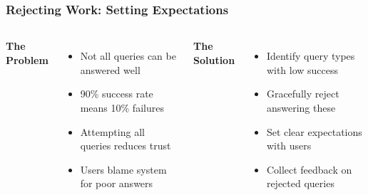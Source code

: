 \begin{frame}
    \frametitle{Rejecting Work: Setting Expectations}
    
    \begin{columns}
        \textbf{The Problem}
        \begin{itemize}
            \item Not all queries can be answered well
            \item 90\% success rate means 10\% failures
            \item Attempting all queries reduces trust
            \item Users blame system for poor answers
        \end{itemize}
        
        \textbf{The Solution}
        \begin{itemize}
            \item Identify query types with low success
            \item Gracefully reject answering these
            \item Set clear expectations with users
            \item Collect feedback on rejected queries
        \end{itemize}
    \end{columns}
    
    \begin{center}
    \end{center}
\end{frame}

